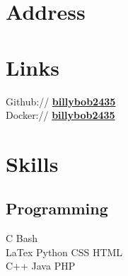 \documentclass[letterpaper]{deedy-resume} %
\begin{document}
\begin{minipage}[t]{0.31\textwidth} %


\section{Address} 


\sectionspace %
\sectionspace %




\section{Links} 

Github:// \href{https://github.com/billybob2435}{\bf billybob2435} \\
Docker:// \href{https://hub.docker.com/u/billybob2435/}{\bf billybob2435} 

\sectionspace %




\section{Skills}

\subsection{Programming}

C \textbullet{} Bash \\ 
LaTex \textbullet{} Python \textbullet{} CSS \textbullet{} HTML   \\
C++ \textbullet{} Java \textbullet{} PHP \\


\end{minipage}
\end{document}
